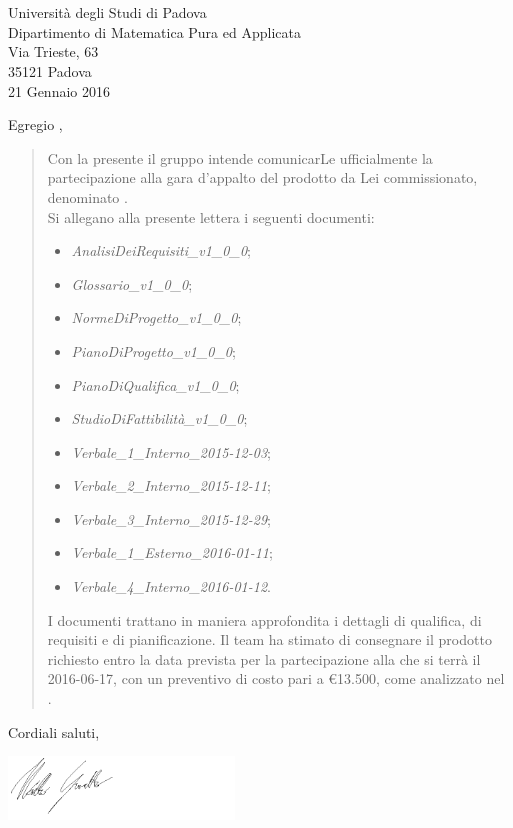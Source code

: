 \documentclass{letter}
\begin{document}

\begin{letter}{\hfill \TV \\
	\hfill \RC \\
	\hfill Università degli Studi di Padova \\
	\hfill Dipartimento di Matematica Pura ed Applicata \\
	\hfill Via Trieste, 63 \\
	\hfill 35121 Padova \\
	\hfill 21 Gennaio 2016}

\date{}
\opening{Egregio \TV,}

	\begin{quotation}
		Con la presente il gruppo \textit{\gruppo} intende comunicarLe ufficialmente la partecipazione alla gara d'appalto del prodotto da Lei commissionato, denominato \textbf{\progetto}.
		\\
		Si allegano alla presente lettera i seguenti documenti:
		\begin{itemize}
			\item \textit{AnalisiDeiRequisiti\_v1\_0\_0};
			\item \textit{Glossario\_v1\_0\_0};
			\item \textit{NormeDiProgetto\_v1\_0\_0};
			\item \textit{PianoDiProgetto\_v1\_0\_0};
			\item \textit{PianoDiQualifica\_v1\_0\_0};
			\item \textit{StudioDiFattibilità\_v1\_0\_0};
			\item \textit{Verbale\_1\_Interno\_2015-12-03};
			\item \textit{Verbale\_2\_Interno\_2015-12-11};
			\item \textit{Verbale\_3\_Interno\_2015-12-29};
			\item \textit{Verbale\_1\_Esterno\_2016-01-11};
			\item \textit{Verbale\_4\_Interno\_2016-01-12}.
		\end{itemize}
		I documenti trattano in maniera approfondita i dettagli di qualifica, di requisiti e di pianificazione.
		Il team ha stimato di consegnare il prodotto richiesto entro la data prevista per la partecipazione alla \RA{} che si terrà il 2016-06-17, con un preventivo di costo pari a \euro13.500, come analizzato nel \textit{\PdP}.	
	\end{quotation}
	\closing{Cordiali saluti,}
	\includegraphics[keepaspectratio = true, width=6cm]{Firma/MGR.png}


\end{letter}
\end{document}
